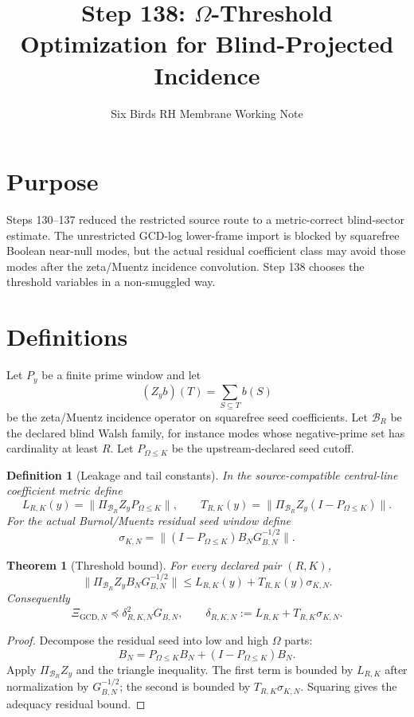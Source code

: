 \documentclass[11pt]{article}
\title{Step 138: $\Omega$-Threshold Optimization for Blind-Projected Incidence}
\author{Six Birds RH Membrane Working Note}
\date{}
\newtheorem{theorem}{Theorem}
\newtheorem{definition}{Definition}
\begin{document}
\maketitle

\section{Purpose}
Steps 130--137 reduced the restricted source route to a metric-correct blind-sector estimate. The unrestricted GCD-log lower-frame import is blocked by squarefree Boolean near-null modes, but the actual residual coefficient class may avoid those modes after the zeta/Muentz incidence convolution. Step 138 chooses the threshold variables in a non-smuggled way.

\section{Definitions}
Let $P_y$ be a finite prime window and let
\[
(Z_y b)(T)=\sum_{S\subseteq T}b(S)
\]
be the zeta/Muentz incidence operator on squarefree seed coefficients. Let $\mathcal B_R$ be the declared blind Walsh family, for instance modes whose negative-prime set has cardinality at least $R$. Let $P_{\Omega\le K}$ be the upstream-declared seed cutoff.

\begin{definition}[Leakage and tail constants]
In the source-compatible central-line coefficient metric define
\[
L_{R,K}(y)=\|\Pi_{\mathcal B_R}Z_yP_{\Omega\le K}\|,
\qquad
T_{R,K}(y)=\|\Pi_{\mathcal B_R}Z_y(I-P_{\Omega\le K})\|.
\]
For the actual Burnol/Muentz residual seed window define
\[
\sigma_{K,N}=\|(I-P_{\Omega\le K})B_NG_{B,N}^{-1/2}\|.
\]
\end{definition}

\begin{theorem}[Threshold bound]
For every declared pair $(R,K)$,
\[
\|\Pi_{\mathcal B_R}Z_yB_NG_{B,N}^{-1/2}\|
\le L_{R,K}(y)+T_{R,K}(y)\sigma_{K,N}.
\]
Consequently
\[
\Xi_{\mathrm{GCD},N}\preceq \delta_{R,K,N}^2G_{B,N},
\qquad
\delta_{R,K,N}:=L_{R,K}+T_{R,K}\sigma_{K,N}.
\]
\end{theorem}

\begin{proof}
Decompose the residual seed into low and high $\Omega$ parts:
\[
B_N=P_{\Omega\le K}B_N+(I-P_{\Omega\le K})B_N.
\]
Apply $\Pi_{\mathcal B_R}Z_y$ and the triangle inequality. The first term is bounded by $L_{R,K}$ after normalization by $G_{B,N}^{-1/2}$; the second is bounded by $T_{R,K}\sigma_{K,N}$. Squaring gives the adequacy residual bound.
\end{proof}
\end{document}
